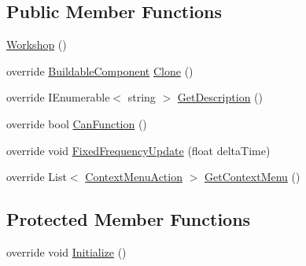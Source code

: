 \subsection*{Public Member Functions}
\begin{DoxyCompactItemize}
\item 
\hyperlink{class_project_porcupine_1_1_buildable_1_1_components_1_1_workshop_ac4acc0001bf738ed18f1ce2aa951344d}{Workshop} ()
\item 
override \hyperlink{class_project_porcupine_1_1_buildable_1_1_components_1_1_buildable_component}{Buildable\+Component} \hyperlink{class_project_porcupine_1_1_buildable_1_1_components_1_1_workshop_a902289f6ee9c0f227e093af73a477009}{Clone} ()
\item 
override I\+Enumerable$<$ string $>$ \hyperlink{class_project_porcupine_1_1_buildable_1_1_components_1_1_workshop_ab72b89bcd9a1c02321dadd29368769d9}{Get\+Description} ()
\item 
override bool \hyperlink{class_project_porcupine_1_1_buildable_1_1_components_1_1_workshop_a1b478ecd3ba6d1229dd851d1ce9d1a7e}{Can\+Function} ()
\item 
override void \hyperlink{class_project_porcupine_1_1_buildable_1_1_components_1_1_workshop_adaf70643c87224e88a4efe3cc45ec288}{Fixed\+Frequency\+Update} (float delta\+Time)
\item 
override List$<$ \hyperlink{class_context_menu_action}{Context\+Menu\+Action} $>$ \hyperlink{class_project_porcupine_1_1_buildable_1_1_components_1_1_workshop_a08da90f814b602c3de05862fdc33dd03}{Get\+Context\+Menu} ()
\end{DoxyCompactItemize}
\subsection*{Protected Member Functions}
\begin{DoxyCompactItemize}
\item 
override void \hyperlink{class_project_porcupine_1_1_buildable_1_1_components_1_1_workshop_af0f0f3e2aad78348bc8f68baddc119a2}{Initialize} ()
\end{DoxyCompactItemize}
